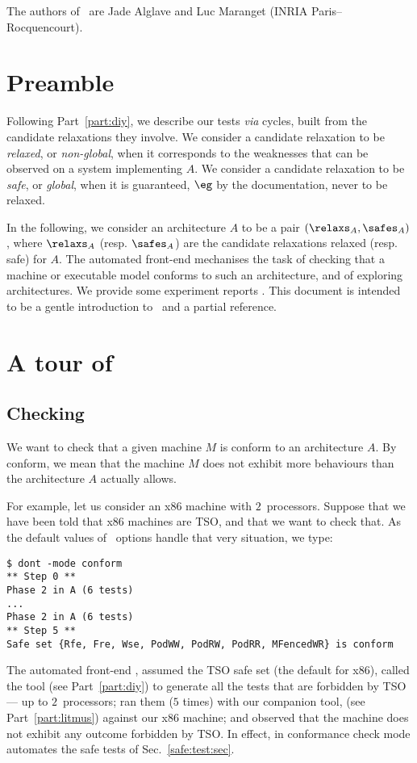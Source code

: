 
The authors of~\dont{} are Jade Alglave and Luc Maranget
(INRIA Paris--Rocquencourt).

\section{Preamble}
Following Part~\ref{part:diy}, we describe our tests \emph{via} cycles, built
from the candidate relaxations they involve.  We consider a candidate
relaxation to be \emph{relaxed}, or \emph{non-global}, when it corresponds to
the weaknesses that can be observed on a system implementing $A$. We consider a
candidate relaxation to be \emph{safe}, or \emph{global}, when it is
guaranteed, $\eg$ by the documentation, never to be relaxed.

In the following, we consider an architecture $A$ to be a pair $(\relaxs_{A},
\safes_{A})$, where $\relaxs_{A}$ (resp.  $\safes_{A}$) are the candidate
relaxations relaxed (resp. safe) for $A$.
The automated front-end \dont{} mechanises the task of checking
that a machine or executable model conforms to such an architecture, and of
exploring architectures.
We provide some experiment reports
.
This document is intended to be a gentle introduction to~\dont{} and
a partial reference.



\section{A tour of~\dont}

\subsection{Checking }
We want to check that a given machine $M$ is conform to an
architecture $A$. By conform, we mean that the machine $M$ does not exhibit
more behaviours than the architecture $A$ actually allows.

For example, let us consider an x86 machine with $2$~processors. Suppose that
we have been told that x86 machines are TSO, and that we want
to check that.
As the default values of~\dont{} options handle that very situation, we type:
\begin{verbatim}
$ dont -mode conform
** Step 0 **
Phase 2 in A (6 tests)
...
Phase 2 in A (6 tests)
** Step 5 **
Safe set {Rfe, Fre, Wse, PodWW, PodRW, PodRR, MFencedWR} is conform
\end{verbatim}
The automated front-end \dont,
assumed the TSO safe set (the default for x86),
called the \diy{} tool (see Part~\ref{part:diy}) to generate
all the tests that are forbidden by TSO --- up to $2$~processors;
ran them ($5$ times) with our companion  tool, (see
Part~\ref{part:litmus}) against our x86 machine;
and observed that the machine does not exhibit any outcome
forbidden by TSO.
In effect, \dont{} in conformance check mode automates the safe
tests of Sec.~\ref{safe:test:sec}. 


